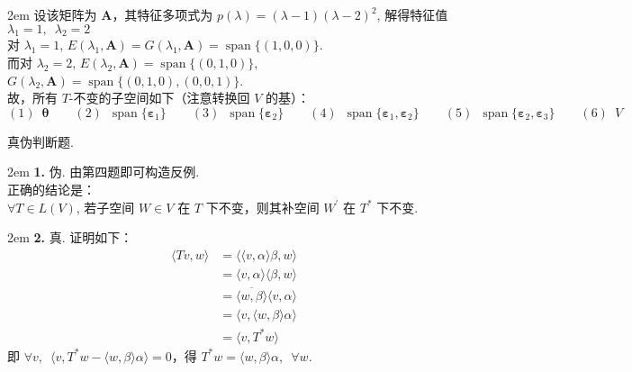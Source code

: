 \documentclass[UTF8,14pt,normal]{ctexart}
\begin{document}
    \hangindent 2em
    \noindent
    设该矩阵为 $ \mathbf{A} $，其特征多项式为 $p(\lambda) = (\lambda - 1)(\lambda - 2)^{2}$, 解得特征值 $\lambda_{1} = 1, \enspace \lambda_{2} = 2$ \\
    对 $\lambda_{1} = 1$, $E(\lambda_{1}, \mathbf{A}) = G(\lambda_{1}, \mathbf{A}) = \operatorname{span}\{(1, 0, 0)\}$. \\
    而对 $\lambda_{2} = 2$, $E(\lambda_{2}, \mathbf{A}) = \operatorname{span}\{(0, 1, 0)\}$, $G(\lambda_{2}, \mathbf{A}) = \operatorname{span}\{(0, 1, 0), (0, 0, 1)\}$. \\
    故，所有 $ T $-不变的子空间如下（注意转换回 $ V $ 的基）：\\
    \[(1) \enspace \boldsymbol{\theta} \qquad (2) \enspace \operatorname{span}\{\boldsymbol{\varepsilon}_{1}\} \qquad  (3) \enspace \operatorname{span}\{\boldsymbol{\varepsilon}_{2}\} \qquad
    (4) \enspace \operatorname{span}\{\boldsymbol{\varepsilon}_{1}, \boldsymbol{\varepsilon}_{2}\} \qquad  (5) \enspace \operatorname{span}\{\boldsymbol{\varepsilon}_{2}, \boldsymbol{\varepsilon}_{3}\} \qquad  (6) \enspace V\]

 真伪判断题.

    \hangindent 2em
    \noindent
    \textbf{1.} 伪. 由第四题即可构造反例. \\
    正确的结论是：\\
    $\forall T \in L(V)$, 若子空间 $ W \in V $ 在 $ T $ 下不变，则其补空间 $ W^{'} $ 在 $ T^{*} $ 下不变.

    \hangindent 2em
    \noindent 
    \textbf{2.} 真. 证明如下：\\
    \begin{align*}
        \langle Tv, w \rangle & = \langle \langle v, \alpha \rangle \beta, w\rangle \\
        & = \langle v, \alpha \rangle \langle \beta, w\rangle \\
        & = \overline{\langle w, \beta \rangle} \langle v, \alpha \rangle \\
        & = \langle v, \langle w, \beta \rangle \alpha \rangle \\
        & = \langle v, T^{*}w \rangle
    \end{align*}
    即 $\forall v, \enspace \langle v, T^{*}w - \langle w, \beta \rangle \alpha \rangle = 0$，得 $T^{*}w = \langle w, \beta \rangle \alpha, \enspace \forall w$.
\end{document}
